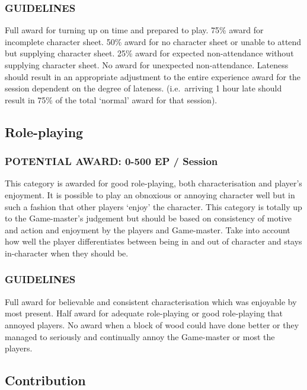 \documentclass{article}
\begin{document}
\begin{multicols}{2}
\subsubsection{GUIDELINES}

Full award for turning up on time and prepared to play.  75\% award
for incomplete character sheet.  50\% award for no character sheet or
unable to attend but supplying character sheet.  25\% award for
expected non-attendance without supplying character sheet.  No award
for unexpected non-attendance.  Lateness should result in an
appropriate adjustment to the entire experience award for the session
dependent on the degree of lateness.  (i.e.\ arriving 1 hour late
should result in 75\% of the total `normal' award for that session).

\subsection{Role-playing}

\subsubsection{POTENTIAL AWARD:  0-500 EP / Session}

This category is awarded for good role-playing, both characterisation
and player's enjoyment.  It is possible to play an obnoxious or
annoying character well but in such a fashion that other players
`enjoy' the character. This category is totally up to the Game-master's
judgement but should be based on consistency of motive and action and
enjoyment by the players and Game-master.  Take into account how well
the player differentiates between being in and out of character and
stays in-character when they should be.

\subsubsection{GUIDELINES}

Full award for believable and consistent characterisation which was
enjoyable by most present.  Half award for adequate role-playing or
good role-playing that annoyed players.  No award when a block of wood
could have done better or they managed to seriously and continually
annoy the Game-master or most the players.

\subsection{Contribution}


\end{multicols}
\end{document}
